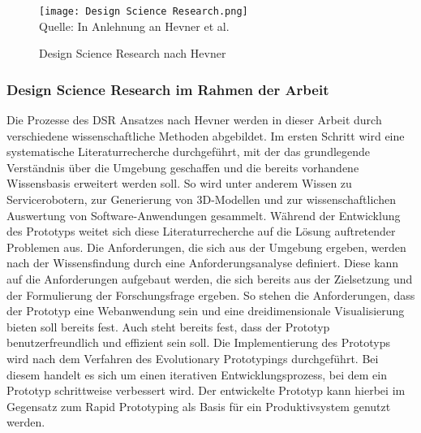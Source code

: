 \begin{figure}[H]
    \caption{Design Science Research nach Hevner}\label{fig:DesignScienceResearch}
    \texttt{[image: Design Science Research.png]}
    \\
    Quelle: In Anlehnung an Hevner et al. \cite[S.~80]{Hevner2004}
\end{figure}

\subsubsection{Design Science Research im Rahmen der Arbeit}

Die Prozesse des \ac{DSR} Ansatzes nach Hevner werden in dieser Arbeit durch verschiedene wissenschaftliche Methoden abgebildet. Im ersten Schritt wird eine systematische Literaturrecherche durchgeführt, mit der das grundlegende Verständnis über die Umgebung geschaffen und die bereits vorhandene Wissensbasis erweitert werden soll. So wird unter anderem Wissen zu Servicerobotern, zur Generierung von 3D-Modellen und zur wissenschaftlichen Auswertung von Software-Anwendungen gesammelt. Während der Entwicklung des Prototyps weitet sich diese Literaturrecherche auf die Lösung auftretender Problemen aus. Die Anforderungen, die sich aus der Umgebung ergeben, werden nach der Wissensfindung durch eine Anforderungsanalyse definiert. Diese kann auf die Anforderungen aufgebaut werden, die sich bereits aus der Zielsetzung und der Formulierung der Forschungsfrage ergeben. So stehen die Anforderungen, dass der Prototyp eine Webanwendung sein und eine dreidimensionale Visualisierung bieten soll bereits fest. Auch steht bereits fest, dass der Prototyp benutzerfreundlich und effizient sein soll. Die Implementierung des Prototyps wird nach dem Verfahren des Evolutionary Prototypings durchgeführt. Bei diesem handelt es sich um einen iterativen Entwicklungsprozess, bei dem ein Prototyp schrittweise verbessert wird. Der entwickelte Prototyp kann hierbei im Gegensatz zum Rapid Prototyping als Basis für ein Produktivsystem genutzt werden.
